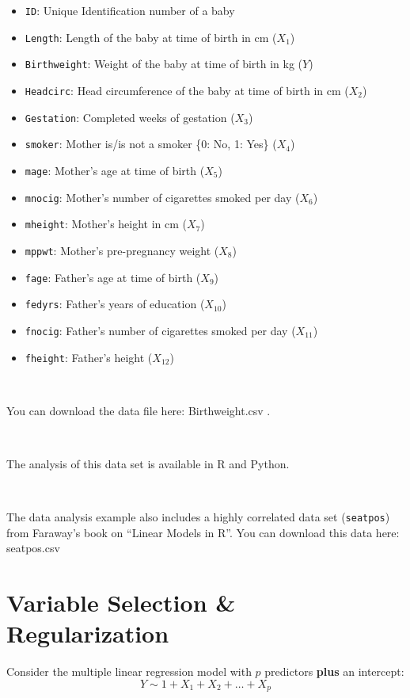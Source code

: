 \documentclass[
]{book}
\providecommand{\tightlist}{%
  \setlength{\itemsep}{0pt}\setlength{\parskip}{0pt}}
\begin{document}
\begin{itemize}
\tightlist
\item
  \texttt{ID}: Unique Identification number of a baby
\item
  \texttt{Length}: Length of the baby at time of birth in cm (\(X_1\))
\item
  \texttt{Birthweight}: Weight of the baby at time of birth in kg (\(Y\))
\item
  \texttt{Headcirc}: Head circumference of the baby at time of birth in cm (\(X_2\))
\item
  \texttt{Gestation}: Completed weeks of gestation (\(X_3\))
\item
  \texttt{smoker}: Mother is/is not a smoker \{0: No, 1: Yes\} (\(X_4\))
\item
  \texttt{mage}: Mother's age at time of birth (\(X_5\))
\item
  \texttt{mnocig}: Mother's number of cigarettes smoked per day (\(X_6\))
\item
  \texttt{mheight}: Mother's height in cm (\(X_7\))
\item
  \texttt{mppwt}: Mother's pre-pregnancy weight (\(X_8\))
\item
  \texttt{fage}: Father's age at time of birth (\(X_9\))
\item
  \texttt{fedyrs}: Father's years of education (\(X_{10}\))
\item
  \texttt{fnocig}: Father's number of cigarettes smoked per day (\(X_{11}\))
\item
  \texttt{fheight}: Father's height (\(X_{12}\))
\end{itemize}

~

You can download the data file here: Birthweight.csv .

~

The analysis of this data set is available in R and Python.

~

The data analysis example also includes a highly correlated data set (\texttt{seatpos}) from Faraway's book on ``Linear Models in R''. You can download this data here: seatpos.csv

\chapter{Variable Selection \& Regularization}\label{variable-selection-regularization}

Consider the multiple linear regression model with \(p\) predictors \textbf{plus} an intercept:
\[Y \sim 1+ X_1+X_2+ \ldots+X_p\]
\end{document}

